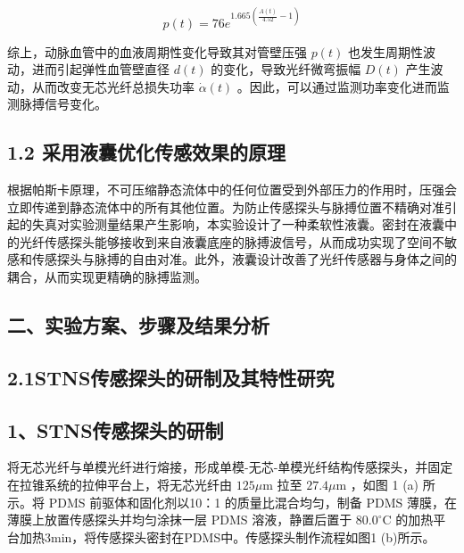 \documentclass[
  10
]{article}
\begin{document}
\[
p (t) = 7 6 e ^ {1. 6 6 5 \left(\frac {A (t)}{4 . 5 2} - 1\right)}\tag{4}
\]

综上，动脉血管中的血液周期性变化导致其对管壁压强 \(p ( t )\)
也发生周期性波动，进而引起弹性血管壁直径 \(d ( t )\)
的变化，导致光纤微弯振幅 \(D ( t )\)
产生波动，从而改变无芯光纤总损失功率 \({ \dot { \alpha } } ( t )\)
。因此，可以通过监测功率变化进而监测脉搏信号变化。

\subsection{1.2
采用液囊优化传感效果的原理}\label{ux91c7ux7528ux6db2ux56caux4f18ux5316ux4f20ux611fux6548ux679cux7684ux539fux7406}

根据帕斯卡原理，不可压缩静态流体中的任何位置受到外部压力的作用时，压强会立即传递到静态流体中的所有其他位置。为防止传感探头与脉搏位置不精确对准引起的失真对实验测量结果产生影响，本实验设计了一种柔软性液囊。密封在液囊中的光纤传感探头能够接收到来自液囊底座的脉搏波信号，从而成功实现了空间不敏感和传感探头与脉搏的自由对准。此外，液囊设计改善了光纤传感器与身体之间的耦合，从而实现更精确的脉搏监测。

\subsection{二、实验方案、步骤及结果分析}\label{ux4e8cux5b9eux9a8cux65b9ux6848ux6b65ux9aa4ux53caux7ed3ux679cux5206ux6790}

\subsection{2.1STNS传感探头的研制及其特性研究}\label{stnsux4f20ux611fux63a2ux5934ux7684ux7814ux5236ux53caux5176ux7279ux6027ux7814ux7a76}

\subsection{1、STNS传感探头的研制}\label{stnsux4f20ux611fux63a2ux5934ux7684ux7814ux5236}

将无芯光纤与单模光纤进行熔接，形成单模-无芯-单模光纤结构传感探头，并固定在拉锥系统的拉伸平台上，将无芯光纤由
\(1 2 5 \mu \mathrm { m }\) 拉至 \(2 7 . 4 \mu \mathrm { m }\) ，如图 1
(a) 所示。将 PDMS 前驱体和固化剂以10：1 的质量比混合均匀，制备 PDMS
薄膜，在薄膜上放置传感探头并均匀涂抹一层 PDMS 溶液，静置后置于
\(8 0 . 0 ^ { \circ } \mathrm { C }\)
的加热平台加热3min，将传感探头密封在PDMS中。传感探头制作流程如图1
(b)所示。
\end{document}
